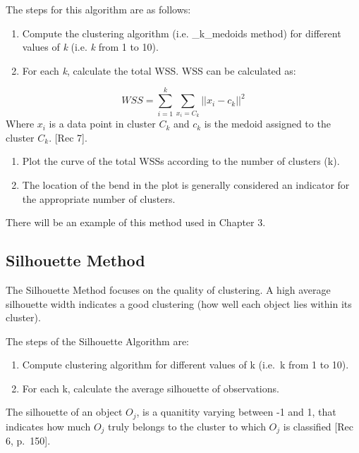 \documentclass[12pt,twoside]{amherstthesis}
\providecommand{\tightlist}{%
  \setlength{\itemsep}{0pt}\setlength{\parskip}{0pt}}
\begin{document}
  The steps for this algorithm are as follows:
  
  \begin{enumerate}
  \def\labelenumi{\arabic{enumi}.}
  \tightlist
  \item
    Compute the clustering algorithm (i.e. \_k\_medoids method) for
    different values of \emph{k} (i.e. \emph{k} from 1 to 10).
  \item
    For each \emph{k}, calculate the total WSS. WSS can be calculated as:
  \end{enumerate}
  
  \[WSS= \sum_{i=1}^k \sum_{x_i = C_k} ||{{x_i- c_k}}||^2\] Where \(x_i\)
  is a data point in cluster \(C_k\) and \(c_k\) is the medoid assigned to
  the cluster \(C_k\). {[}Rec 7{]}.
  
  \begin{enumerate}
  \def\labelenumi{\arabic{enumi}.}
  \setcounter{enumi}{2}
  \tightlist
  \item
    Plot the curve of the total WSSs according to the number of clusters
    (k).
  \item
    The location of the bend in the plot is generally considered an
    indicator for the appropriate number of clusters.
  \end{enumerate}
  
  There will be an example of this method used in Chapter 3.
  
  \subsection{Silhouette Method}\label{silhouette-method}
  
  The Silhouette Method focuses on the quality of clustering. A high
  average silhouette width indicates a good clustering (how well each
  object lies within its cluster).
  
  The steps of the Silhouette Algorithm are:
  
  \begin{enumerate}
  \def\labelenumi{\arabic{enumi}.}
  \tightlist
  \item
    Compute clustering algorithm for different values of k (i.e.~k from 1
    to 10).
  \item
    For each k, calculate the average silhouette of observations.
  \end{enumerate}
  
  The silhouette of an object \(O_j\), is a quanitity varying between -1
  and 1, that indicates how much \(O_j\) truly belongs to the cluster to
  which \(O_j\) is classified {[}Rec 6, p.~150{]}.
  
\end{document}
